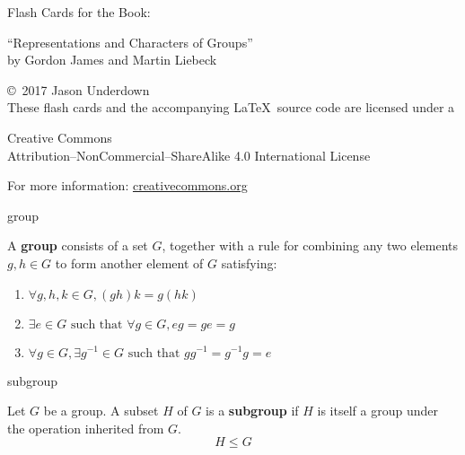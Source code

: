 \documentclass[avery5371,grid]{flashcards}
\newcommand{\st}{\textrm{ such that }}
\renewcommand{\le}{\leqslant}
\newcommand{\defn}[1]{\textbf{#1}}
\begin{document}
\begin{flashcard}[Copying]
  { Flash Cards for the Book:

    \begin{center}
      ``Representations and Characters of Groups'' \\
      by Gordon James and Martin Liebeck
    \end{center}
  }
  \copyright\ 2017 Jason Underdown \\

  These flash cards and the accompanying \LaTeX \, source code are
  licensed under a
  \begin{center}
    Creative Commons \\
    Attribution--NonCommercial--ShareAlike 4.0 International License \\
    \ccbyncsa
  \end{center}
  For more information: \url{creativecommons.org}
\end{flashcard}

\begin{flashcard}[Definition]{group}

  A \defn{group} consists of a set $G$, together with a rule for
  combining any two elements $g, h \in G$ to form another element of
  $G$ satisfying:
  \begin{enumerate}
  \item $\forall g,h,k \in G, (gh)k = g(hk)$
  \item $\exists e \in G \st \forall g \in G, eg=ge=g$
  \item $\forall g \in G, \exists g^{-1} \in G \st gg^{-1} = g^{-1}g = e$
  \end{enumerate}

\end{flashcard}

\begin{flashcard}[Definition]{subgroup}

Let $G$ be a group. A subset $H$ of $G$ is a \defn{subgroup} if $H$ is
itself a group under the operation inherited from $G$.
\[
  H \le G
\]

\end{flashcard}
\end{document}
